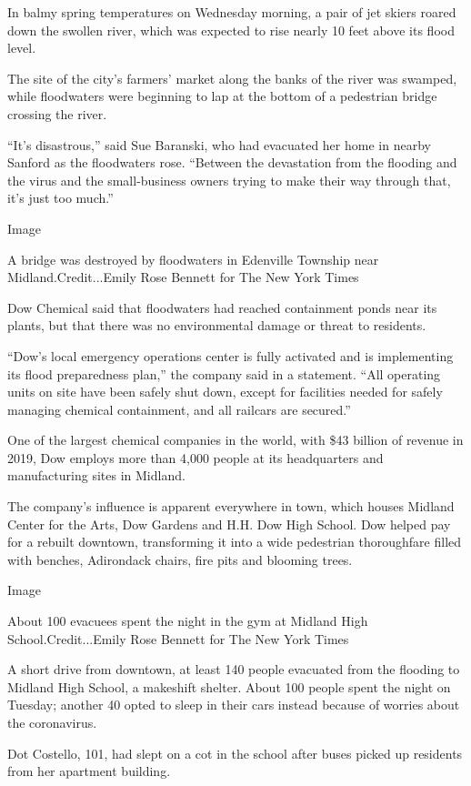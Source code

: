 In balmy spring temperatures on Wednesday morning, a pair of jet skiers
roared down the swollen river, which was expected to rise nearly 10 feet
above its flood level.

The site of the city's farmers' market along the banks of the river was
swamped, while floodwaters were beginning to lap at the bottom of a
pedestrian bridge crossing the river.

``It's disastrous,'' said Sue Baranski, who had evacuated her home in
nearby Sanford as the floodwaters rose. ``Between the devastation from
the flooding and the virus and the small-business owners trying to make
their way through that, it's just too much.''

Image

A bridge was destroyed by floodwaters in Edenville Township near
Midland.Credit...Emily Rose Bennett for The New York Times

Dow Chemical said that floodwaters had reached containment ponds near
its plants, but that there was no environmental damage or threat to
residents.

``Dow's local emergency operations center is fully activated and is
implementing its flood preparedness plan,'' the company said in a
statement. ``All operating units on site have been safely shut down,
except for facilities needed for safely managing chemical containment,
and all railcars are secured.''

One of the largest chemical companies in the world, with \$43 billion of
revenue in 2019, Dow employs more than 4,000 people at its headquarters
and manufacturing sites in Midland.

The company's influence is apparent everywhere in town, which houses
Midland Center for the Arts, Dow Gardens and H.H. Dow High School. Dow
helped pay for a rebuilt downtown, transforming it into a wide
pedestrian thoroughfare filled with benches, Adirondack chairs, fire
pits and blooming trees.

Image

About 100 evacuees spent the night in the gym at Midland High
School.Credit...Emily Rose Bennett for The New York Times

A short drive from downtown, at least 140 people evacuated from the
flooding to Midland High School, a makeshift shelter. About 100 people
spent the night on Tuesday; another 40 opted to sleep in their cars
instead because of worries about the coronavirus.

Dot Costello, 101, had slept on a cot in the school after buses picked
up residents from her apartment building.

